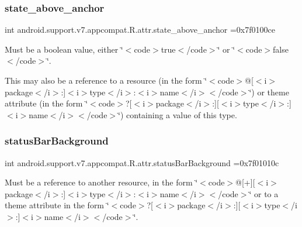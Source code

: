 \subsubsection{\texorpdfstring{state\+\_\+above\+\_\+anchor}{state\_above\_anchor}}
{\footnotesize\ttfamily int android.\+support.\+v7.\+appcompat.\+R.\+attr.\+state\+\_\+above\+\_\+anchor =0x7f0100ce\hspace{0.3cm}{\ttfamily [static]}}

Must be a boolean value, either \char`\"{}$<$code$>$true$<$/code$>$\char`\"{} or \char`\"{}$<$code$>$false$<$/code$>$\char`\"{}. 

This may also be a reference to a resource (in the form \char`\"{}$<$code$>$@\mbox{[}$<$i$>$package$<$/i$>$\+:\mbox{]}$<$i$>$type$<$/i$>$\+:$<$i$>$name$<$/i$>$$<$/code$>$\char`\"{}) or theme attribute (in the form \char`\"{}$<$code$>$?\mbox{[}$<$i$>$package$<$/i$>$\+:\mbox{]}\mbox{[}$<$i$>$type$<$/i$>$\+:\mbox{]}$<$i$>$name$<$/i$>$$<$/code$>$\char`\"{}) containing a value of this type. \mbox{\label{classandroid_1_1support_1_1v7_1_1appcompat_1_1R_1_1attr_ae6ea5839099a688958923fba26f61fd5}} 
\subsubsection{\texorpdfstring{status\+Bar\+Background}{statusBarBackground}}
{\footnotesize\ttfamily int android.\+support.\+v7.\+appcompat.\+R.\+attr.\+status\+Bar\+Background =0x7f01010c\hspace{0.3cm}{\ttfamily [static]}}

Must be a reference to another resource, in the form \char`\"{}$<$code$>$@\mbox{[}+\mbox{]}\mbox{[}$<$i$>$package$<$/i$>$\+:\mbox{]}$<$i$>$type$<$/i$>$\+:$<$i$>$name$<$/i$>$$<$/code$>$\char`\"{} or to a theme attribute in the form \char`\"{}$<$code$>$?\mbox{[}$<$i$>$package$<$/i$>$\+:\mbox{]}\mbox{[}$<$i$>$type$<$/i$>$\+:\mbox{]}$<$i$>$name$<$/i$>$$<$/code$>$\char`\"{}. \mbox{\label{classandroid_1_1support_1_1v7_1_1appcompat_1_1R_1_1attr_acfaccc406e612fb6fae81417220d3286}} 
